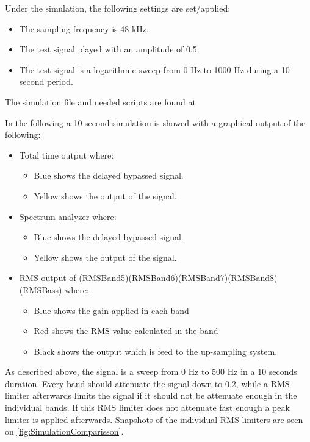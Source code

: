 Under the simulation, the following settings are set/applied:
\begin{itemize}
\item The sampling frequency is 48 kHz.
\item The test signal played with an amplitude of 0.5.
\item The test signal is a logarithmic sweep from 0 Hz to 1000 Hz during a 10 second period.
\end{itemize}

The simulation file and needed scripts are found at  


In the following a 10 second simulation is showed with a graphical output of the following:
\begin{itemize}
\item Total time output where:
\begin{itemize}
\item Blue shows the delayed bypassed signal.
\item Yellow shows the output of the signal.
\end{itemize}
\item Spectrum analyzer where:
\begin{itemize}
\item Blue shows the delayed bypassed signal.
\item Yellow shows the output of the signal.
\end{itemize}
\item RMS output of (RMSBand5)(RMSBand6)(RMSBand7)(RMSBand8)(RMSBass) where:
\begin{itemize}
\item Blue shows the gain applied in each band
\item Red shows the RMS value calculated in the band
\item Black shows the output which is feed to the up-sampling system.
\end{itemize} 
\end{itemize}

As described above, the signal is a sweep from 0 Hz to 500 Hz in a 10 seconds duration. Every band should attenuate the signal down to 0.2, while a RMS limiter afterwards limits the signal if it should not be attenuate enough in the individual bands. If this RMS limiter does not attenuate fast enough a peak limiter is applied afterwards. Snapshots of the individual RMS limiters are seen on \autoref{fig:SimulationComparisson}.    


